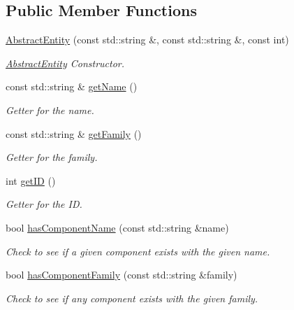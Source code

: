 \subsection*{Public Member Functions}
\begin{DoxyCompactItemize}
\item 
\hypertarget{class_abstract_entity_a29525b5d30f53d5f2532647d29e5fb27}{\hyperlink{class_abstract_entity_a29525b5d30f53d5f2532647d29e5fb27}{Abstract\-Entity} (const std\-::string \&, const std\-::string \&, const int)}\label{dd/d52/class_abstract_entity_a29525b5d30f53d5f2532647d29e5fb27}

\begin{DoxyCompactList}\small\item\em \hyperlink{class_abstract_entity}{Abstract\-Entity} Constructor. \end{DoxyCompactList}\item 
const std\-::string \& \hyperlink{class_abstract_entity_a57960409ca61d962d0ed56fb86484b08}{get\-Name} ()
\begin{DoxyCompactList}\small\item\em Getter for the name. \end{DoxyCompactList}\item 
const std\-::string \& \hyperlink{class_abstract_entity_a19a6d01003cb95bacc05bcdd062809a0}{get\-Family} ()
\begin{DoxyCompactList}\small\item\em Getter for the family. \end{DoxyCompactList}\item 
int \hyperlink{class_abstract_entity_a8c91767f8d376d3e599de5e96920c1bc}{get\-I\-D} ()
\begin{DoxyCompactList}\small\item\em Getter for the I\-D. \end{DoxyCompactList}\item 
bool \hyperlink{class_abstract_entity_ac912f452eb0ec94a8655dc164c498f0e}{has\-Component\-Name} (const std\-::string \&name)
\begin{DoxyCompactList}\small\item\em Check to see if a given component exists with the given name. \end{DoxyCompactList}\item 
bool \hyperlink{class_abstract_entity_a519616484d76b00265a3927c4669cf9c}{has\-Component\-Family} (const std\-::string \&family)
\begin{DoxyCompactList}\small\item\em Check to see if any component exists with the given family. \end{DoxyCompactList}\item 

\end{DoxyCompactItemize}

